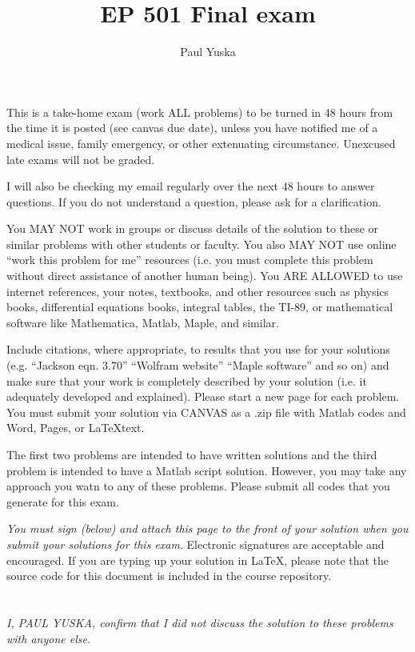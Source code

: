 \documentclass[12pt,letterpaper]{article}
\author{Paul Yuska}
\title{EP 501 Final exam}
\begin{document}
\maketitle

This is a take-home exam (work ALL problems) to be turned in 48 hours from the time it is posted (see canvas due date), unless you have notified me of a medical issue, family emergency, or other extenuating circumstance.  Unexcused late exams will not be graded.  

I will also be checking my email regularly over the next 48 hours to answer questions.  If you do not understand a question, please ask for a clarification.  

You MAY NOT work in groups or discuss details of the solution to these or similar problems with other students or faculty.  You also MAY NOT use online ``work this problem for me'' resources (i.e. you must complete this problem without direct assistance of another human being).  You ARE ALLOWED to use internet references, your notes, textbooks, and other resources such as physics books, differential equations books, integral tables, the TI-89, or mathematical software like Mathematica, Matlab, Maple, and similar.  

Include citations, where appropriate, to results that you use for your solutions (e.g. ``Jackson eqn. 3.70'' ``Wolfram website'' ``Maple software'' and so on) and make sure that your work is completely described by your solution (i.e. it adequately developed and explained).   Please start a new page for each problem.  You must submit your solution via CANVAS as a .zip file with Matlab codes and Word, Pages, or \LaTeX text.

The first two problems are intended to have written solutions and the third problem is intended to have a Matlab script solution.  However, you may take any approach you watn to any of these problems.  Please submit all codes that you generate for this exam.  


\emph{You must sign (below) and attach this page to the front of your solution when you submit your solutions for this exam}.  Electronic signatures are acceptable and encouraged.  If you are typing up your solution in \LaTeX, please note that the source code for this document is included in the course repository.  \\
\\
\\


\emph{I, PAUL YUSKA, confirm that I did not discuss the solution to these problems with anyone else.}
\end{document}
